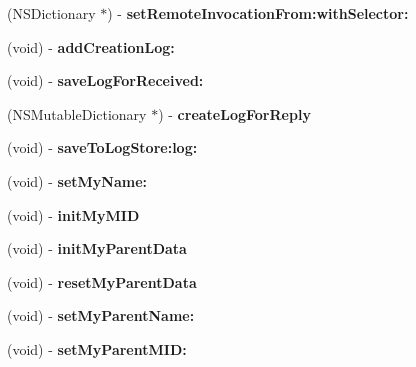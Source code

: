 \begin{DoxyCompactItemize}
\item 
\hypertarget{interface_messenger_system_a60c9a5dc9cf6d420d944edead0c957d8}{
(NSDictionary $\ast$) -\/ {\bfseries setRemoteInvocationFrom:withSelector:}}
\label{dc/dc9/interface_messenger_system_a60c9a5dc9cf6d420d944edead0c957d8}

\item 
\hypertarget{interface_messenger_system_aa4f4f9dbed2ccb22b30fa3bc86229560}{
(void) -\/ {\bfseries addCreationLog:}}
\label{dc/dc9/interface_messenger_system_aa4f4f9dbed2ccb22b30fa3bc86229560}

\item 
\hypertarget{interface_messenger_system_aea64a6b2e2486edb5a3443a23d13934f}{
(void) -\/ {\bfseries saveLogForReceived:}}
\label{dc/dc9/interface_messenger_system_aea64a6b2e2486edb5a3443a23d13934f}

\item 
\hypertarget{interface_messenger_system_a51d6be48e11ee01ba98c720b46ae398e}{
(NSMutableDictionary $\ast$) -\/ {\bfseries createLogForReply}}
\label{dc/dc9/interface_messenger_system_a51d6be48e11ee01ba98c720b46ae398e}

\item 
\hypertarget{interface_messenger_system_a04b3995de0fb3486ee1f64bc8868b8f3}{
(void) -\/ {\bfseries saveToLogStore:log:}}
\label{dc/dc9/interface_messenger_system_a04b3995de0fb3486ee1f64bc8868b8f3}

\item 
\hypertarget{interface_messenger_system_a0388f0bc3b5d73f8404fb65ae9f2478d}{
(void) -\/ {\bfseries setMyName:}}
\label{dc/dc9/interface_messenger_system_a0388f0bc3b5d73f8404fb65ae9f2478d}

\item 
\hypertarget{interface_messenger_system_adac10123acd489108d70a63d1b42669c}{
(void) -\/ {\bfseries initMyMID}}
\label{dc/dc9/interface_messenger_system_adac10123acd489108d70a63d1b42669c}

\item 
\hypertarget{interface_messenger_system_ae32a19a0477498f6b079551dfa08a15e}{
(void) -\/ {\bfseries initMyParentData}}
\label{dc/dc9/interface_messenger_system_ae32a19a0477498f6b079551dfa08a15e}

\item 
\hypertarget{interface_messenger_system_a111b446c0453facea8fc35774323dae7}{
(void) -\/ {\bfseries resetMyParentData}}
\label{dc/dc9/interface_messenger_system_a111b446c0453facea8fc35774323dae7}

\item 
\hypertarget{interface_messenger_system_a77cb388881cfe26e1b6440a1409c7c23}{
(void) -\/ {\bfseries setMyParentName:}}
\label{dc/dc9/interface_messenger_system_a77cb388881cfe26e1b6440a1409c7c23}

\item 
\hypertarget{interface_messenger_system_a4b835de059160b6e22eadd4035769c04}{
(void) -\/ {\bfseries setMyParentMID:}}
\label{dc/dc9/interface_messenger_system_a4b835de059160b6e22eadd4035769c04}

\end{DoxyCompactItemize}
